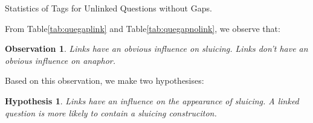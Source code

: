 \documentclass[bsc,frontabs,twoside,singlespacing,parskip,deptreport]{infthesis}     %
\newtheorem*{observation}{Observation}
\newtheorem*{hypo}{Hypothesis}
\begin{document}
\begin{minipage}{\textwidth}
\begin{minipage}[t]{0.45\textwidth}
\caption{Statistics of Tags for Unlinked Questions without Gaps.}
\label{tab:quegapnolink}

        \end{minipage}
    \end{minipage}


From Table\ref{tab:quegaplink} and Table\ref{tab:quegapnolink}, we observe that:

\begin{observation}
Links have an obvious influence on sluicing. Links don't have an obvious influence on anaphor.
\end{observation}

Based on this observation, we make two hypothesises:

\begin{hypo}
Links have an influence on the appearance of sluicing. A linked question is more likely to contain a sluicing construciton.
\end{hypo}
\end{document}
